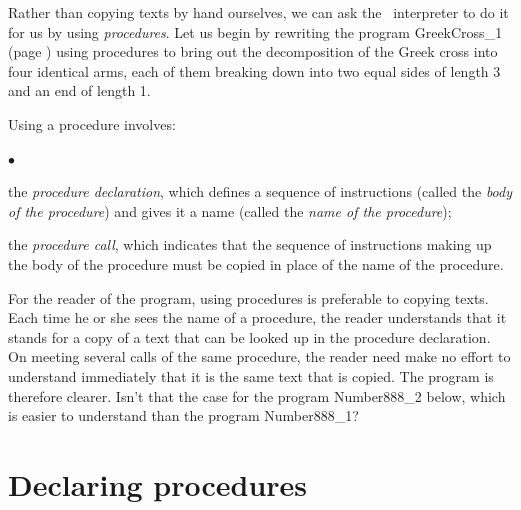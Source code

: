 Rather than copying texts by hand ourselves, we can
ask the \python\ interpreter to do it for us by using
{\em procedures}. Let us begin by rewriting the program
{\idt GreekCross\_1} (page \pageref{prog:CroixGrecque_1}) us\-ing procedures to bring
out the decomposition of the Greek cross into
four iden\-ti\-cal arms, each of them breaking down into two
equal sides of length 3 and an end of length 1.

\newpage
\vspace*{3cm}%
\vspace*{-3cm}%


\noindent Using a procedure involves:
\begin{list}{$\scriptscriptstyle\bullet$}{
}
\item the {\em procedure declaration}, which defines a sequence
of instructions (called the {\em body of the procedure}) and gives it a
name (called the {\em name of the procedure});
\item the {\em procedure call}, which indicates that the sequence
of instructions mak\-ing up the body of the procedure must be copied
in place of the name of the procedure.
\end{list}

\noindent For the reader of the program, using procedures is
preferable to copying texts. Each time he or she sees the
name of a procedure, the reader understands that it stands for a copy of a text
that can be looked up in the procedure declaration. On meeting
several calls of the same procedure, the reader need make no effort
to understand immediately that it is the same text that is
copied. The program is therefore clearer. Isn't that the case for the
program {\idt Number888\_2} below, which is easier
to understand than the program {\idt Number888\_1}?

\vspace{\baselineskip}
\vspace*{2cm}%
\vspace*{-2cm}%


\section{Declaring procedures}

